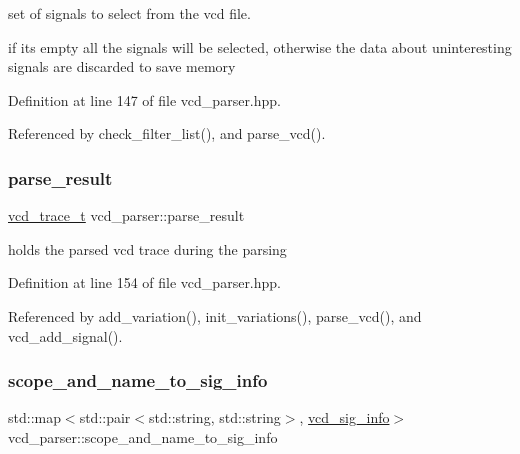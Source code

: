 set of signals to select from the vcd file. 

if it\textquotesingle{}s empty all the signals will be selected, otherwise the data about uninteresting signals are discarded to save memory 

Definition at line 147 of file vcd\+\_\+parser.\+hpp.



Referenced by check\+\_\+filter\+\_\+list(), and parse\+\_\+vcd().

\mbox{\label{classvcd__parser_a4196e255ed8ca87224c6f521effe9d4e}} 
\subsubsection{\texorpdfstring{parse\+\_\+result}{parse\_result}}
{\footnotesize\ttfamily \hyperlink{classvcd__parser_a84b85cb9df5165fca362a9da87c5a02f}{vcd\+\_\+trace\+\_\+t} vcd\+\_\+parser\+::parse\+\_\+result\hspace{0.3cm}{\ttfamily [private]}}



holds the parsed vcd trace during the parsing 



Definition at line 154 of file vcd\+\_\+parser.\+hpp.



Referenced by add\+\_\+variation(), init\+\_\+variations(), parse\+\_\+vcd(), and vcd\+\_\+add\+\_\+signal().

\mbox{\label{classvcd__parser_a5998e29d09f04bc34b5748770bac3877}} 
\subsubsection{\texorpdfstring{scope\+\_\+and\+\_\+name\+\_\+to\+\_\+sig\+\_\+info}{scope\_and\_name\_to\_sig\_info}}
{\footnotesize\ttfamily std\+::map$<$std\+::pair$<$std\+::string, std\+::string$>$, \hyperlink{classvcd__sig__info}{vcd\+\_\+sig\+\_\+info}$>$ vcd\+\_\+parser\+::scope\+\_\+and\+\_\+name\+\_\+to\+\_\+sig\+\_\+info\hspace{0.3cm}{\ttfamily [private]}}



